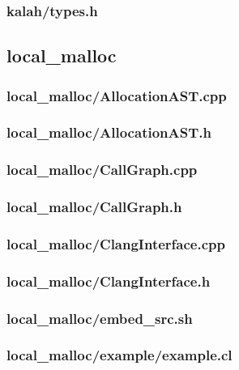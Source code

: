 \documentclass{article}
\begin{document}
\subsubsection*{kalah/types.h}


\subsection*{local\_malloc}
\subsubsection*{local\_malloc/AllocationAST.cpp}


\subsubsection*{local\_malloc/AllocationAST.h}


\subsubsection*{local\_malloc/CallGraph.cpp}


\subsubsection*{local\_malloc/CallGraph.h}


\subsubsection*{local\_malloc/ClangInterface.cpp}


\subsubsection*{local\_malloc/ClangInterface.h}


\subsubsection*{local\_malloc/embed\_src.sh}


\subsubsection*{local\_malloc/example/example.cl}

\end{document}
